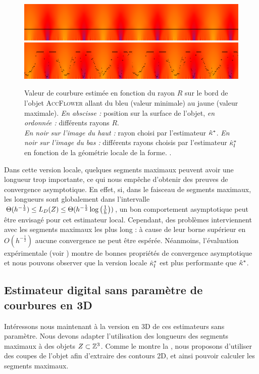 \begin{figure}[ht]{
  \begin{center}
    \includegraphics[width=.95\linewidth]{images/Curvature/ScaleSpace_Flower_Global}
    \includegraphics[width=.95\linewidth]{images/Curvature/ScaleSpace_Flower_Local}
  \end{center}}
  \caption[.]{Valeur de courbure estimée en fonction du rayon $R$ sur le bord de
  l'objet \textsc{AccFlower} allant du bleu (valeur minimale) au jaune (valeur
  maximale). \emph{En abscisse :} position sur la surface de l'objet, \emph{en
  ordonnée :} différents rayons $R$.
  \\
  \emph{En noir sur l'image du haut :} rayon choisi par l'estimateur $\hat{\kappa}^{*}$.
  \emph{En noir sur l'image du bas :} différents rayons choisis par l'estimateur
  $\hat{\kappa}^{*}_{l}$ en fonction de la géométrie locale de la forme.
  \label{fig:curvature-pf-radii}.}
\end{figure}

Dans cette version locale, quelques segments maximaux peuvent avoir une longueur
trop importante, ce qui nous empêche d'obtenir des preuves de convergence
asymptotique. En effet, si, dans le faisceau de segments maximaux, les longueurs
sont globalement dans l'intervalle $\Theta(h^{-\frac{1}{3}}) \le L_D(
{Z} ) \le \Theta(h^{-\frac{1}{3}} \log \left(\frac{1}{h}\right))$, un
bon comportement asymptotique peut être envisagé pour cet estimateur local.
Cependant, des problèmes interviennent avec les segments maximaux les plus long : à
cause de leur borne supérieur en $O(h^{-\frac{1}{2}})$ aucune convergence ne peut
être espérée. Néanmoins, l'évaluation expérimentale (voir
) montre de bonnes propriétés de
convergence asymptotique et nous pouvons observer que la version locale
$\hat{\kappa}^{*}_{l}$ est plus performante que $\hat{\kappa}^{*}$.
%
\subsection{Estimateur digital sans paramètre de courbures en 3D}
%
Intéressons nous maintenant à la version en 3D de ces estimateurs sans paramètre.
Nous devons adapter l'utilisation des longueurs des segments maximaux à des
objets $Z \subset \mathbb{Z}^3$. Comme le montre la
, nous proposons d'utiliser des coupes de
l’objet afin d'extraire des contours 2D, et ainsi pouvoir calculer les segments
maximaux.

